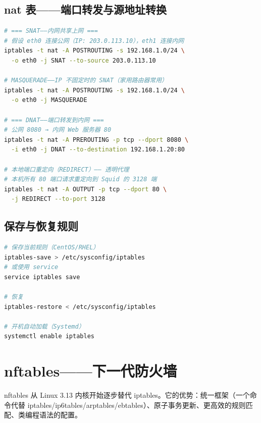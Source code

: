 \documentclass[12pt,UTF8]{ctexbook}
\begin{document}
\subsection{nat 表——端口转发与源地址转换}

\begin{lstlisting}[language=bash]
# === SNAT——内网共享上网 ===
# 假设 eth0 连接公网（IP: 203.0.113.10），eth1 连接内网
iptables -t nat -A POSTROUTING -s 192.168.1.0/24 \
  -o eth0 -j SNAT --to-source 203.0.113.10

# MASQUERADE——IP 不固定时的 SNAT（家用路由器常用）
iptables -t nat -A POSTROUTING -s 192.168.1.0/24 \
  -o eth0 -j MASQUERADE

# === DNAT——端口转发到内网 ===
# 公网 8080 → 内网 Web 服务器 80
iptables -t nat -A PREROUTING -p tcp --dport 8080 \
  -i eth0 -j DNAT --to-destination 192.168.1.20:80

# 本地端口重定向（REDIRECT）—— 透明代理
# 本机所有 80 端口请求重定向到 Squid 的 3128 端
iptables -t nat -A OUTPUT -p tcp --dport 80 \
  -j REDIRECT --to-port 3128
\end{lstlisting}

\subsection{保存与恢复规则}

\begin{lstlisting}[language=bash]
# 保存当前规则（CentOS/RHEL）
iptables-save > /etc/sysconfig/iptables
# 或使用 service
service iptables save

# 恢复
iptables-restore < /etc/sysconfig/iptables

# 开机自动加载（Systemd）
systemctl enable iptables
\end{lstlisting}

\section{nftables——下一代防火墙}
\label{sec:nftables}

nftables 从 Linux 3.13 内核开始逐步替代 iptables。它的优势：统一框架（一个命令代替 iptables/ip6tables/arptables/ebtables）、原子事务更新、更高效的规则匹配、类编程语法的配置。
\end{document}
